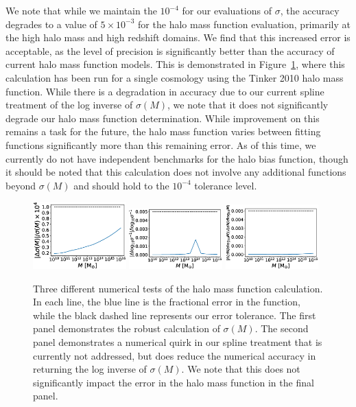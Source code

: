 \documentclass[\docopts]{\docclass}
\begin{document}
We note that while we maintain the $10^{-4}$ for our evaluations of $\sigma$, the accuracy degrades to a value of $5\times10^{-3}$ for the halo mass function evaluation, primarily at the high halo mass and high redshift domains. We find that this increased error is acceptable, as the level of precision is significantly better than the accuracy of current halo mass function models. This is demonstrated in Figure~\ref{fig:hmf}, where this calculation has been run for a single cosmology using the Tinker 2010 halo mass function. While there is a degradation in accuracy due to our current spline treatment of the log inverse of $\sigma(M)$, we note that it does not significantly degrade our halo mass function determination. While improvement on this remains a task for the future, the halo mass function varies between fitting functions significantly more than this remaining error. As of this time, we currently do not have independent benchmarks for the halo bias function, though it should be noted that this calculation does not involve any additional functions beyond $\sigma(M)$ and should hold to the $10^{-4}$ tolerance level.

\begin{figure}
\includegraphics[width=0.32\textwidth]{hmf_model1.eps}
\includegraphics[width=0.32\textwidth]{hmf_model1_b.eps}
\includegraphics[width=0.32\textwidth]{hmf_model1_c.eps}
\caption{Three different numerical tests of the halo mass function calculation. In each line, the blue line is the fractional error in the function, while the black dashed line represents our error tolerance. The first panel demonstrates the robust calculation of $\sigma(M)$. The second panel demonstrates a numerical quirk in our spline treatment that is currently not addressed, but does reduce the numerical accuracy in returning the log inverse of $\sigma(M)$. We note that this does not significantly impact the error in the halo mass function in the final panel.}
\label{fig:hmf}
\end{figure}
\end{document}
